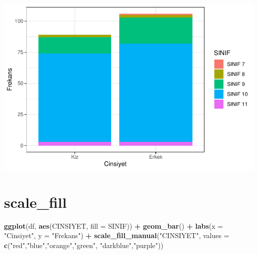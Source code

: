 \documentclass[
  oneside]{book}
\newenvironment{Shaded}{\begin{snugshade}}{\end{snugshade}}
\newcommand{\AttributeTok}[1]{\textcolor[rgb]{0.13,0.29,0.53}{#1}}
\newcommand{\FunctionTok}[1]{\textcolor[rgb]{0.13,0.29,0.53}{\textbf{#1}}}
\newcommand{\NormalTok}[1]{#1}
\newcommand{\SpecialCharTok}[1]{\textcolor[rgb]{0.81,0.36,0.00}{\textbf{#1}}}
\newcommand{\StringTok}[1]{\textcolor[rgb]{0.31,0.60,0.02}{#1}}
\begin{document}
\begin{center}\includegraphics[width=1\linewidth]{15-betimleyici-istatistik_files/figure-latex/unnamed-chunk-56-1} \end{center}

\hypertarget{scale_fill}{%
\section{scale\_fill}\label{scale_fill}}

\begin{Shaded}
\begin{Highlighting}[]
\FunctionTok{ggplot}\NormalTok{(df, }\FunctionTok{aes}\NormalTok{(CINSIYET, }\AttributeTok{fill =}\NormalTok{ SINIF)) }\SpecialCharTok{+}
  \FunctionTok{geom\_bar}\NormalTok{() }\SpecialCharTok{+}
   \FunctionTok{labs}\NormalTok{(}\AttributeTok{x =} \StringTok{"Cinsiyet"}\NormalTok{,}
       \AttributeTok{y =} \StringTok{"Frekans"}\NormalTok{) }\SpecialCharTok{+}
  \FunctionTok{scale\_fill\_manual}\NormalTok{(}\StringTok{"CINSIYET"}\NormalTok{, }\AttributeTok{values =} \FunctionTok{c}\NormalTok{(}\StringTok{"red"}\NormalTok{,}\StringTok{"blue"}\NormalTok{,}\StringTok{"orange"}\NormalTok{,}\StringTok{"green"}\NormalTok{,}
                                           \StringTok{"darkblue"}\NormalTok{,}\StringTok{"purple"}\NormalTok{))}
\end{Highlighting}
\end{Shaded}
\end{document}
